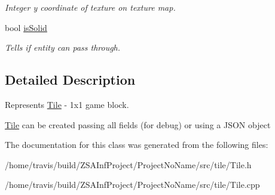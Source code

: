 \begin{DoxyCompactItemize}
\begin{DoxyCompactList}\small\item\em Integer y coordinate of texture on texture map. \end{DoxyCompactList}\item 
\hypertarget{classTile_a3a32e61b42ec4bc8bb1d924261c19403}{bool \hyperlink{classTile_a3a32e61b42ec4bc8bb1d924261c19403}{is\-Solid}}\label{classTile_a3a32e61b42ec4bc8bb1d924261c19403}

\begin{DoxyCompactList}\small\item\em Tells if entity can pass through. \end{DoxyCompactList}\end{DoxyCompactItemize}


\subsection{Detailed Description}
Represents \hyperlink{classTile}{Tile} -\/ 1x1 game block. 

\hyperlink{classTile}{Tile} can be created passing all fields (for debug) or using a J\-S\-O\-N object 

The documentation for this class was generated from the following files\-:\begin{DoxyCompactItemize}
\item 
/home/travis/build/\-Z\-S\-A\-Inf\-Project/\-Project\-No\-Name/src/tile/Tile.\-h\item 
/home/travis/build/\-Z\-S\-A\-Inf\-Project/\-Project\-No\-Name/src/tile/Tile.\-cpp\end{DoxyCompactItemize}
